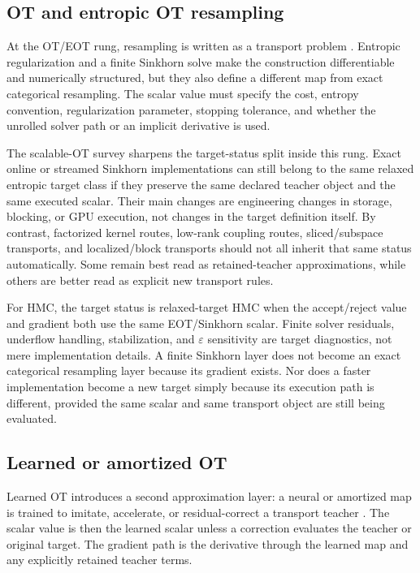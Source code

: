 \subsection{OT and entropic OT resampling}

At the OT/EOT rung, resampling is written as a transport problem \citep{reich2013nonparametric,cuturi2013sinkhorn,peyre2019computational,corenflos2021differentiable}.  Entropic
regularization and a finite Sinkhorn solve make the construction differentiable
and numerically structured, but they also define a different map from exact
categorical resampling.  The scalar value must specify the cost, entropy
convention, regularization parameter, stopping tolerance, and whether the
unrolled solver path or an implicit derivative is used.

The scalable-OT survey sharpens the target-status split inside this rung.  Exact
online or streamed Sinkhorn implementations can still belong to the same relaxed
entropic target class if they preserve the same declared teacher object and the
same executed scalar.  Their main changes are engineering changes in storage,
blocking, or GPU execution, not changes in the target definition itself.  By
contrast, factorized kernel routes, low-rank coupling routes, sliced/subspace
transports, and localized/block transports should not all inherit that same
status automatically.  Some remain best read as retained-teacher approximations,
while others are better read as explicit new transport rules.

For HMC, the target status is relaxed-target HMC when the accept/reject value
and gradient both use the same EOT/Sinkhorn scalar.  Finite solver residuals,
underflow handling, stabilization, and $\varepsilon$ sensitivity are target
diagnostics, not mere implementation details.  A finite Sinkhorn layer does not
become an exact categorical resampling layer because its gradient exists.  Nor
does a faster implementation become a new target simply because its execution
path is different, provided the same scalar and same transport object are still
being evaluated.

\subsection{Learned or amortized OT}

Learned OT introduces a second approximation layer: a neural or amortized map is
trained to imitate, accelerate, or residual-correct a transport teacher
\citep{amos2017icnn,makkuva2020otmapping,uscidda2023mongegap,gracykchen2024geonet}.  The
scalar value is then the learned scalar unless a correction evaluates the
teacher or original target.  The gradient path is the derivative through the
learned map and any explicitly retained teacher terms.

